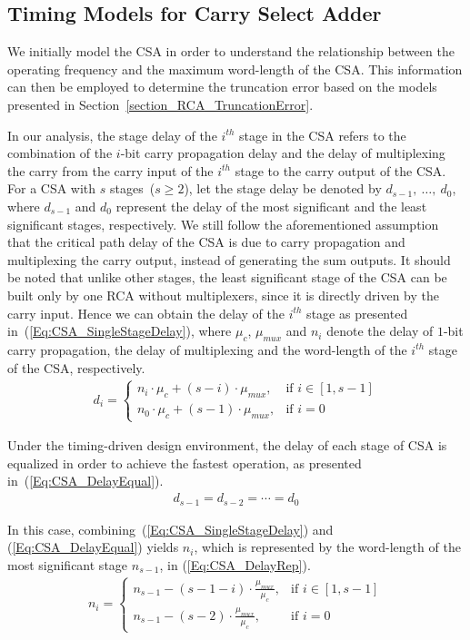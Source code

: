 \documentclass[prodmode,acmtrets]{acmsmall} %
\begin{document}
\subsection{Timing Models for Carry Select Adder}
We initially model the CSA in order to understand the relationship between the operating frequency and the maximum word-length of the CSA. This information can then be employed to determine the truncation error based on the models presented in Section~\ref{section_RCA_TruncationError}.

In our analysis, the stage delay of the $i^{th}$ stage in the CSA refers to the combination of the $i$-bit carry propagation delay and the delay of multiplexing the carry from the carry input of the $i^{th}$ stage to the carry output of the CSA. For a CSA with $s$ stages~($s\geqslant 2$), let the stage delay be denoted by $d_{s-1},~\dots,~d_{0}$, where $d_{s-1}$ and $d_{0}$ represent the delay of the most significant and the least significant stages, respectively. We still follow the aforementioned assumption that the critical path delay of the CSA is due to carry propagation and multiplexing the carry output, instead of generating the sum outputs. It should be noted that unlike other stages, the least significant stage of the CSA can be built only by one RCA without multiplexers, since it is directly driven by the carry input. Hence we can obtain the delay of the $i^{th}$ stage as presented in~(\ref{Eq:CSA_SingleStageDelay}), where $\mu_{c}$, $\mu_{mux}$ and $n_i$ denote the delay of $1$-bit carry propagation, the delay of multiplexing and the word-length of the $i^{th}$ stage of the CSA, respectively.
%
\begin{eqnarray}\label{Eq:CSA_SingleStageDelay}
  d_i=\left\{
    \begin{matrix}
      n_i\cdot \mu_{c}+(s-i)\cdot\mu_{mux}, &\textrm{if $i\in\left[1,s-1\right]$}\\
      n_0\cdot \mu_c + (s-1)\cdot\mu_{mux}, & \textrm{if $i=0$}
    \end{matrix}
  \right.
\end{eqnarray}

Under the timing-driven design environment, the delay of each stage of CSA is equalized in order to achieve the fastest operation, as presented in~(\ref{Eq:CSA_DelayEqual}).
%
\begin{eqnarray}\label{Eq:CSA_DelayEqual}
  d_{s-1}=d_{s-2}=\cdots=d_{0}
\end{eqnarray}

In this case, combining~(\ref{Eq:CSA_SingleStageDelay}) and (\ref{Eq:CSA_DelayEqual}) yields $n_i$, which is represented by the word-length of the most significant stage $n_{s-1}$, in (\ref{Eq:CSA_DelayRep}).
%
\begin{eqnarray}\label{Eq:CSA_DelayRep}
 n_i=\left\{
	\begin{matrix}
	  n_{s-1}-(s-1-i)\cdot\frac{\mu_{mux}}{\mu_c}, & \textrm{if $i\in\left[1,s-1\right]$}\\
	  n_{s-1}-(s-2)\cdot\frac{\mu_{mux}}{\mu_c}, &\textrm{if $i=0$}
	\end{matrix}
    \right.
\end{eqnarray}
\end{document}
